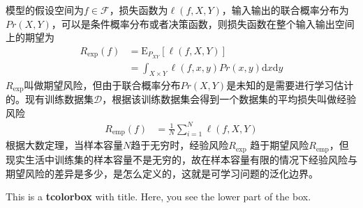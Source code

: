 
模型的假设空间为$f\in \mathcal{F}$，损失函数为$\ell(f,X,Y)$，输入输出的联合概率分布为$Pr(X,Y)$，可以是条件概率分布或者决策函数，则损失函数在整个输入输出空间上的期望为
\begin{equation}\label{Eq: exp loss}
\begin{split}
  R_{\textrm{exp}}(f) &= \mathrm{E}_{P_{XY}}[\ell(f,X,Y)] \\
   &= \int_{X\times Y}\ell(f,x,y)Pr(x,y)\mathrm{d}x\mathrm{d}y
\end{split}
\end{equation}
$R_{\textrm{exp}}$叫做期望风险，但由于联合概率分布$Pr(X,Y)$是未知的是需要进行学习估计的。现有训练数据集$\mathcal{D}$，根据该训练数据集会得到一个数据集的平均损失叫做经验风险
\begin{equation}
\begin{split}
    R_{\textrm{emp}}(f) & = \frac{1}{N}\sum_{i=1}^N \ell(f,X,Y)
\end{split}
\end{equation}
根据大数定理，当样本容量$N$趋于无穷时，经验风险$R_{\textrm{exp}}$ 趋于期望风险$R_{\textrm{emp}}$，但现实生活中训练集的样本容量不是无穷的，故在样本容量有限的情况下经验风险与期望风险的差异是多少，是怎么定义的，这就是可学习问题的泛化边界。

\begin{tcolorbox}[title=强]
    This is a \textbf{tcolorbox} with title.
    \tcblower
    Here, you see the lower part of the box.
\end{tcolorbox}

